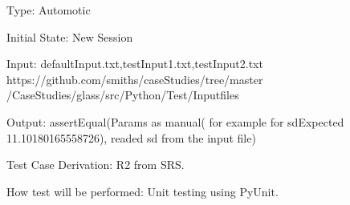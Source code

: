 \documentclass[12pt]{article}
\begin{document}
\begin{enumerate}
Type: Automotic

Initial State: New Session

Input: defaultInput.txt,testInput1.txt,testInput2.txt \\ https://github.com/smiths/caseStudies/tree/master
/CaseStudies/glass/src/Python/Test/Inputfiles


Output: assertEqual(Params as manual( for example for sdExpected 11.10180165558726), readed sd from the input file)

Test Case Derivation: R2 from SRS.

How test will be performed: Unit testing using PyUnit.




\end{enumerate}
\end{document}
